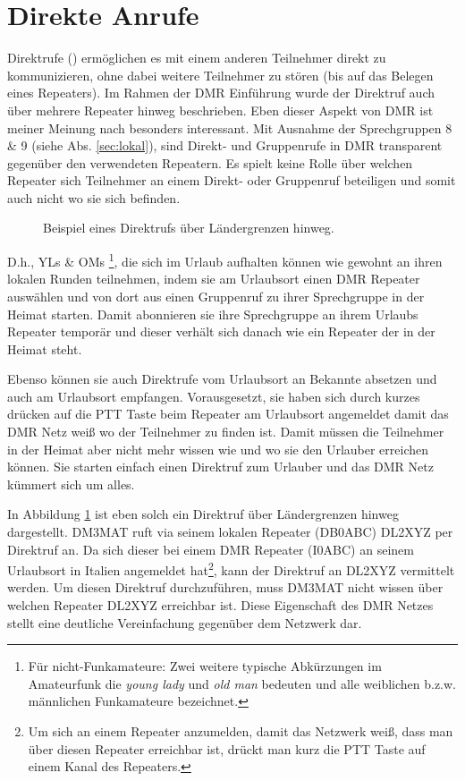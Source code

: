 \section{Direkte Anrufe} \label{sec:privatecall}
Direktrufe () ermöglichen es mit einem anderen Teilnehmer direkt zu kommunizieren, ohne dabei weitere Teilnehmer zu stören (bis auf das Belegen eines Repeaters). Im Rahmen der DMR Einführung wurde der Direktruf auch über mehrere Repeater hinweg beschrieben. Eben dieser Aspekt von DMR ist meiner Meinung nach besonders interessant. Mit Ausnahme der Sprechgruppen 8 \& 9 (siehe Abs. \ref{sec:lokal}), sind Direkt- und Gruppenrufe in DMR transparent gegenüber den verwendeten Repeatern. Es spielt keine Rolle über welchen Repeater sich Teilnehmer an einem Direkt- oder Gruppenruf beteiligen und somit auch nicht wo sie sich befinden. 

\begin{figure}[!ht]
 \centering
 
 \caption{Beispiel eines Direktrufs über Ländergrenzen hinweg.} \label{fig:pc}
\end{figure}

D.h., YLs \& OMs \footnote{Für nicht-Funkamateure: Zwei weitere typische Abkürzungen im Amateurfunk die \emph{young lady} und \emph{old man} bedeuten und alle weiblichen b.z.w. männlichen Funkamateure bezeichnet.}, die sich im Urlaub aufhalten können wie gewohnt an ihren lokalen Runden teilnehmen, indem sie am Urlaubsort einen DMR Repeater auswählen und von dort aus einen Gruppenruf zu ihrer Sprechgruppe in der Heimat starten. Damit abonnieren sie ihre Sprechgruppe an ihrem Urlaubs Repeater temporär und dieser verhält sich danach wie ein Repeater der in der Heimat steht. 

Ebenso können sie auch Direktrufe vom Urlaubsort an Bekannte absetzen und auch am Urlaubsort empfangen. Vorausgesetzt, sie haben sich durch kurzes drücken auf die PTT Taste beim Repeater am Urlaubsort angemeldet damit das DMR Netz weiß wo der Teilnehmer zu finden ist. Damit müssen die Teilnehmer in der Heimat aber nicht mehr wissen wie und wo sie den Urlauber erreichen können. Sie starten einfach einen Direktruf zum Urlauber und das DMR Netz kümmert sich um alles.

In Abbildung \ref{fig:pc} ist eben solch ein Direktruf über Ländergrenzen hinweg dargestellt. DM3MAT ruft via seinem lokalen Repeater (DB0ABC) DL2XYZ per Direktruf an. Da sich dieser bei einem DMR Repeater (I0ABC) an seinem Urlaubsort in Italien angemeldet hat\footnote{Um sich an einem Repeater anzumelden, damit das Netzwerk weiß, dass man über diesen Repeater erreichbar ist, drückt man kurz die PTT Taste auf einem Kanal des Repeaters.}, kann der Direktruf an DL2XYZ vermittelt werden. Um diesen Direktruf durchzuführen, muss DM3MAT nicht wissen über welchen Repeater DL2XYZ erreichbar ist. Diese Eigenschaft des DMR Netzes stellt eine deutliche Vereinfachung gegenüber dem  Netzwerk dar. 